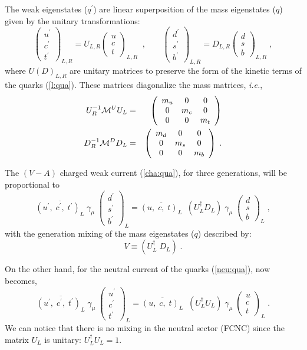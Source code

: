 \documentclass[12pt]{report}
\newcommand{\g}{\gamma}
\newcommand{\ba}{\begin{array}}
\newcommand{\ea}{\end{array}}
\begin{document}
The weak eigenstates ($q^\prime$) are linear superposition of the
mass eigenstates ($q$) given by the unitary transformations:
\[
\left( \ba{c}
{ u^\prime}\\
{ c^\prime}\\
{ t^\prime}
\ea \right)_{L,R} = U_{L,R} \left( \ba{c}
{ u} \\
{ c} \\
{ t} 
\ea \right)_{L,R} \;\; , \;\;\;\;\;\;\;
\left( \ba{c}
{ d^\prime}\\
{ s^\prime}\\
{ b^\prime}
\ea \right)_{L,R} = D_{L,R} \left( \ba{c}
{ d} \\
{ s} \\
{ b} 
\ea \right)_{L,R} \; , 
\]
where $U(D)_{L,R}$ are unitary matrices to preserve the form of the
kinetic terms of the quarks (\ref{l:qua}). These matrices diagonalize the mass
matrices, {\it i.e.},
\begin{eqnarray*}
U_R^{-1} {\cal M}^U U_L &=& 
\left( \ba{ccc}
m_u 	& 0 	& 0\\
0   	& m_c 	& 0\\
0	& 0	& m_t 
\ea \right)
\\
D_R^{-1} {\cal M}^D D_L &=& 
\left( \ba{ccc}
m_d 	& 0 	& 0\\
0   	& m_s 	& 0\\
0	& 0	& m_b 
\ea \right) \; .
\end{eqnarray*}

The $(V-A)$ charged weak current (\ref{cha:qua}), for three
generations, will be proportional to
\[
\overline{(u^\prime, \; c^\prime, \; t^\prime)_L} \; \g_\mu \; \left( \ba{c}
	      						d^\prime\\
	      	 					s^\prime\\
							b^\prime
             					 \ea \right)_L =
\overline{(u, \; c, \; t)_L} \;\; (U^\dagger_L D_L) \; \g_\mu \; 
						\left( \ba{c}
	      						d\\
	      	 					s\\
							b
             					 \ea \right)_L \; ,
\]
with the generation mixing of the mass eigenstates ($q$) described by: 
\[
V \equiv (U^\dagger_L \; D_L) \; .
\]

On the other hand, for the neutral current of the quarks
(\ref{neu:qua}), now becomes,
\[
\overline{(u^\prime, \; c^\prime, \; t^\prime)_L} \; \g_\mu \; \left( \ba{c}
	      						u^\prime\\
	      	 					c^\prime\\
							t^\prime
             					 \ea \right)_L =
\overline{(u, \; c, \; t)_L} \;\; (U^\dagger_L U_L) \; \g_\mu \; 
						\left( \ba{c}
	      						u\\
	      	 					c\\
							t
             					 \ea \right)_L \; .
\]
We can notice that there is no mixing in the neutral sector (FCNC) since 
the matrix $U_{L}$ is unitary: $U^\dagger_{L} U_{L} = 1$. 
\end{document}
